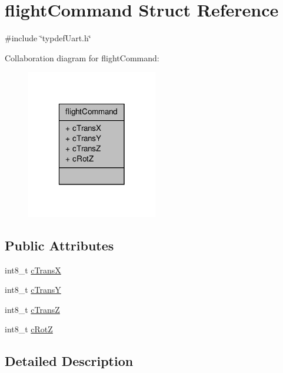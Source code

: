 \hypertarget{structflightCommand}{\section{flight\-Command Struct Reference}
\label{structflightCommand}
}


{\ttfamily \#include \char`\"{}typdef\-Uart.\-h\char`\"{}}



Collaboration diagram for flight\-Command\-:\nopagebreak
\begin{figure}[H]
\begin{center}
\leavevmode
\includegraphics[width=162pt]{structflightCommand__coll__graph}
\end{center}
\end{figure}
\subsection*{Public Attributes}
\begin{DoxyCompactItemize}
\item 
int8\-\_\-t \hyperlink{structflightCommand_af700666e91aa7b7d619640bc75b9b907}{c\-Trans\-X}
\item 
int8\-\_\-t \hyperlink{structflightCommand_a4ec008f3e964d4e8ff8f700e4ec8d54a}{c\-Trans\-Y}
\item 
int8\-\_\-t \hyperlink{structflightCommand_abe6fac04c37189e2310de28de7df01d0}{c\-Trans\-Z}
\item 
int8\-\_\-t \hyperlink{structflightCommand_a8747d9907a0b26163b4fead3712797eb}{c\-Rot\-Z}
\end{DoxyCompactItemize}


\subsection{Detailed Description}


